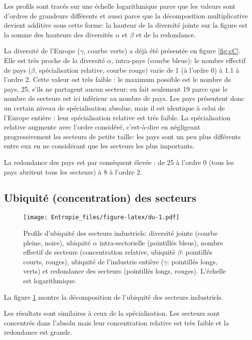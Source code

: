 \documentclass[fleqn,10pt]{ArtEcoFoG} %
\begin{document}
Les profils sont tracés sur une échelle logarithmique parce que les
valeurs sont d'ordres de grandeurs différents et aussi parce que la
décomposition multiplicative devient additive sous cette forme: la
hauteur de la diversité jointe sur la figure est la somme des hauteurs
des diversités \(\alpha\) et \(\beta\) et de la redondance.

La diversité de l'Europe (\(\gamma\), courbe verte) a déjà été présentée
en figure \ref{fig:cC}. Elle est très proche de la diversité \(\alpha\),
intra-pays (courbe bleue): le nombre effectif de pays (\(\beta\),
spécialisation relative, courbe rouge) varie de 1 (à l'ordre 0) à 1.1 à
l'ordre 2. Cette valeur est très faible : le maximum possible est le
nombre de pays, 25, s'ils ne partagent aucun secteur; en fait seulement
19 parce que le nombre de secteurs est ici inférieur au nombre de pays.
Les pays présentent donc un certain niveau de spécialisation absolue,
mais il est identique à celui de l'Europe entière : leur spécialisation
relative est très faible. La spécialisation relative augmente avec
l'ordre considéré, c'est-à-dire en négligeant progressivement les
secteurs de petite taille: les pays sont un peu plus différents entre
eux en ne considérant que les secteurs les plus importants.

La redondance des pays est par conséquent élevée : de 25 à l'ordre 0
(tous les pays abritent tous les secteurs) à 8 à l'ordre 2.

\subsection{Ubiquité (concentration) des
secteurs}\label{ubiquite-concentration-des-secteurs}

\begin{figure}
\centering
\texttt{[image: Entropie\_files/figure-latex/du-1.pdf]}
\caption{\label{fig:du}Profils d'ubiquité des secteurs industriels:
diversité jointe (courbe pleine, noire), ubiquité \(\alpha\)
intra-sectorielle (pointillés bleus), nombre effectif de secteurs
(concentration relative, ubiquité \(\beta\): pointillés courts, rouges),
ubiquité de l'industrie entière (\(\gamma\): pointillés longs, verts) et
redondance des secteurs (pointillés longs, rouges). L'échelle est
logarithmique.}
\end{figure}

La figure \ref{fig:du} montre la décomposition de l'ubiquité des
secteurs industriels.

Les résultats sont similaires à ceux de la spécialisation. Les secteurs
sont concentrés dans l'absolu mais leur concentration relative est très
faible et la redondance est grande.
\end{document}
